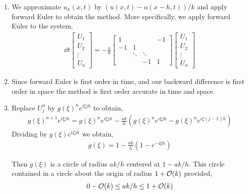 \documentclass[10pt]{article}
\begin{document}
\begin{solution}[Solution]
\begin{enumerate}[label=(\alph*)]
    \item We approximate \( u_x(x,t) \) by \( (u(x,t) - u(x-h,t)) / k \) and apply forward Euler to obtain the method. More specifically, we apply forward Euler to the system,
        \begin{align*}
            \dd{}{t}\left[\begin{array}{c}U_1\\U_2 \\ \vdots \\ U_n\end{array}\right]
            = -\frac{a}{h}\left[\begin{array}{cccc}
                1 & & & -1 \\
            -1 & 1 \\
            & \ddots & \ddots \\
            & & -1 & 1
            \end{array}\right]
            \left[\begin{array}{c}U_1\\U_2 \\ \vdots \\ U_n\end{array}\right]
        \end{align*}
        
    \item Since forward Euler is first order in time, and our backward difference is first order in space the method is first order accurate in time and space. 
    \item Replace \( U_j^n \) by \( g(\xi)^n e^{i\xi j h} \) to obtain,
        \begin{align*}
            g(\xi)^{n+1} e^{i\xi j h} = g(\xi)^n e^{i\xi j h} - \frac{ak}{h} \left(g(\xi)^n e^{i\xi j h} - g(\xi)^n e^{i\xi (j-1)h}\right)
        \end{align*}
        Dividing by \( g(\xi) e^{i\xi j h} \) we obtain,
        \begin{align*}
            g(\xi) = 1 - \frac{ak}{h}\left(1-e^{-i\xi h} \right)
        \end{align*}
        
        Then \( g(\xi) \) is a circle of radius \( ak/h \) centered at \( 1-ak/h \). This circle contained in a circle about the origin of radius \( 1+\mathcal{O}(k) \) provided,
        \begin{align*}
            0-\mathcal{O}(k) \leq ak/h \leq 1 + \mathcal{O}(k)
        \end{align*}


\end{enumerate}
\end{solution}
\end{document}
